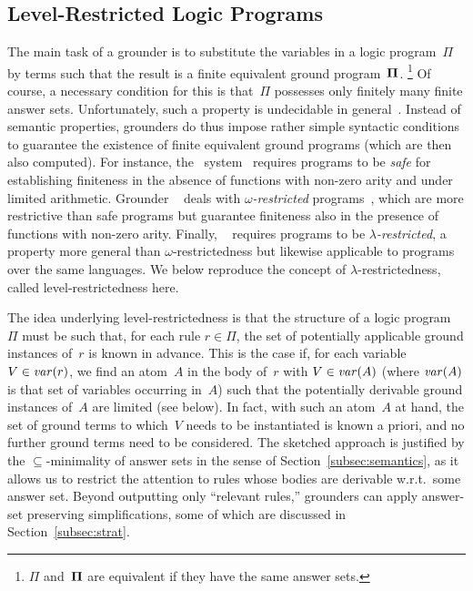 \begin{oldstuff}
\subsection{Level-Restricted Logic Programs}\label{subsec:lambda}

The main task of a grounder is to substitute the variables in a logic program~$\Pi$
by terms such that the result is a finite equivalent ground program~$\mathbf{\Pi}$.%
\footnote{$\Pi$ and~$\mathbf{\Pi}$ are equivalent if they have the same answer sets.}
Of course, a necessary condition for this is that~$\Pi$ possesses
only finitely many finite answer sets.
Unfortunately, such a property is undecidable in general~\cite{daeigovo01a}.
Instead of semantic properties, grounders do thus impose rather simple syntactic
conditions to guarantee the existence of finite equivalent ground programs
(which are then also computed).
For instance, the \dlv\ system~\cite{dlv03a} requires programs to be \emph{safe} for
establishing finiteness in the absence of functions with non-zero arity and under
limited arithmetic.
Grounder \lparse~\cite{lparseManual} deals with \emph{$\omega$-restricted}
programs~\cite{syrjanen01a}, which are more restrictive than safe programs
but guarantee finiteness also in the presence of functions with non-zero arity.
Finally, \gringo~\cite{gescth07a} requires programs to be \emph{$\lambda$-restricted},
a property more general than $\omega$-restrictedness but likewise applicable
to programs over the same languages.
We below reproduce the concept of $\lambda$-restrictedness,
called level-restrictedness here.

The idea underlying level-restrictedness is that the structure of a logic program~$\Pi$
must be such that, for each rule $r\in\Pi$,
the set of potentially applicable ground instances of~$r$ is known in advance.
This is the case if, for each variable~$V\in\mathit{var}(r)$,
we find an atom~$A$ in the body of~$r$ with
$V\in\mathit{var}(A)$ (where $\mathit{var}(A)$ is that set of variables occurring in~$A$)
such that the potentially derivable ground instances of~$A$ are limited (see below).
In fact, with such an atom~$A$ at hand,
the set of ground terms to which~$V$ needs to be instantiated is known a priori,
and no further ground terms need to be considered.
The sketched approach is justified by the $\subseteq$-minimality of answer sets
in the sense of Section~\ref{subsec:semantics},
as it allows us to restrict the attention to rules whose bodies are derivable w.r.t.\
some answer set.
Beyond outputting only ``relevant rules,''
grounders can apply answer-set preserving simplifications,
some of which are discussed in Section~\ref{subsec:strat}.


\end{oldstuff}
